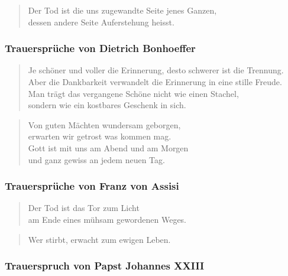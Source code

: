 \documentclass[ngerman,a4paper,11pt]{scrreprt}
\begin{document}
\begin{verse}
Der Tod ist die uns zugewandte Seite jenes Ganzen, \\
dessen andere Seite Auferstehung heisst. \\
\end{verse}

\subsubsection*{Trauersprüche von Dietrich Bonhoeffer}
\label{sec-1-1-1-2-2}

\begin{verse}
Je schöner und voller die Erinnerung, desto schwerer ist die Trennung. \\
Aber die Dankbarkeit verwandelt die Erinnerung in eine stille Freude. \\
Man trägt das vergangene Schöne nicht wie einen Stachel, \\
sondern wie ein kostbares Geschenk in sich. \\
\end{verse}

\begin{verse}
Von guten Mächten wundersam geborgen, \\
erwarten wir getrost was kommen mag. \\
Gott ist mit uns am Abend und am Morgen \\
und ganz gewiss an jedem neuen Tag. \\
\end{verse}

\subsubsection*{Trauersprüche von Franz von Assisi}
\label{sec-1-1-1-2-3}

\begin{verse}
Der Tod ist das Tor zum Licht \\
am Ende eines mühsam gewordenen Weges. \\
\end{verse}

\begin{verse}
Wer stirbt, erwacht zum ewigen Leben. \\
\end{verse}

\subsubsection*{Trauerspruch von Papst Johannes XXIII}
\label{sec-1-1-1-2-4}
\end{document}
